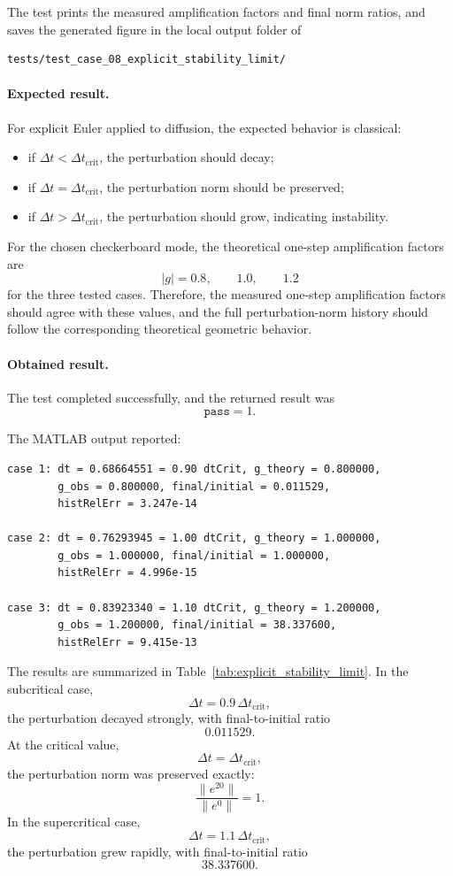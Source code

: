 The test prints the measured amplification factors and final norm ratios, and saves the generated figure in the local output folder of
\begin{verbatim}
tests/test_case_08_explicit_stability_limit/
\end{verbatim}

\paragraph{Expected result.}
For explicit Euler applied to diffusion, the expected behavior is classical:

\begin{itemize}
    \item if \(\Delta t < \Delta t_{\mathrm{crit}}\), the perturbation should decay;
    \item if \(\Delta t = \Delta t_{\mathrm{crit}}\), the perturbation norm should be preserved;
    \item if \(\Delta t > \Delta t_{\mathrm{crit}}\), the perturbation should grow, indicating instability.
\end{itemize}

For the chosen checkerboard mode, the theoretical one-step amplification factors are
\[
|g| = 0.8,\qquad 1.0,\qquad 1.2
\]
for the three tested cases. Therefore, the measured one-step amplification factors should agree with these values, and the full perturbation-norm history should follow the corresponding theoretical geometric behavior.

\paragraph{Obtained result.}
The test completed successfully, and the returned result was
\[
\texttt{pass} = 1.
\]

The MATLAB output reported:
\begin{verbatim}
case 1: dt = 0.68664551 = 0.90 dtCrit, g_theory = 0.800000,
        g_obs = 0.800000, final/initial = 0.011529,
        histRelErr = 3.247e-14

case 2: dt = 0.76293945 = 1.00 dtCrit, g_theory = 1.000000,
        g_obs = 1.000000, final/initial = 1.000000,
        histRelErr = 4.996e-15

case 3: dt = 0.83923340 = 1.10 dtCrit, g_theory = 1.200000,
        g_obs = 1.200000, final/initial = 38.337600,
        histRelErr = 9.415e-13
\end{verbatim}

The results are summarized in Table~\ref{tab:explicit_stability_limit}. In the subcritical case,
\[
\Delta t = 0.9\,\Delta t_{\mathrm{crit}},
\]
the perturbation decayed strongly, with final-to-initial ratio
\[
0.011529.
\]
At the critical value,
\[
\Delta t = \Delta t_{\mathrm{crit}},
\]
the perturbation norm was preserved exactly:
\[
\frac{\|e^{20}\|}{\|e^0\|} = 1.
\]
In the supercritical case,
\[
\Delta t = 1.1\,\Delta t_{\mathrm{crit}},
\]
the perturbation grew rapidly, with final-to-initial ratio
\[
38.337600.
\]

